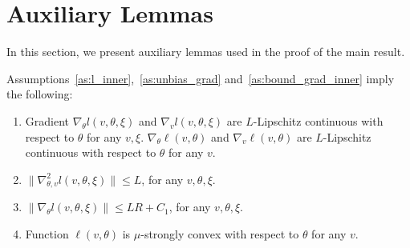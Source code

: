 \documentclass[11 pt]{article}
\begin{document}
\section{Auxiliary Lemmas}\label{app:prep}
In this section, we present auxiliary lemmas used in the proof of the main result.
\begin{lemma}\label{lemma:assumption} Assumptions~\ref{as:l_inner},~\ref{as:unbias_grad} and~\ref{as:bound_grad_inner} imply the following: 
\begin{enumerate}[label=(\arabic*)]
\item Gradient $\nabla_\theta l(v,\theta,\xi)$ and $\nabla_v l(v,\theta,\xi)$ are $L$-Lipschitz continuous with respect to $\theta$ for any $v,\xi$. $\nabla_\theta \ell(v,\theta)$ and $\nabla_v \ell(v,\theta)$ are $L$-Lipschitz continuous with respect to $\theta$ for any $v$.

\item $\| \nabla_{\theta,v}^2l(v,\theta,\xi) \| \leq L$, for any $v, \theta,\xi.$

\item $\| \nabla_\theta l(v,\theta,\xi) \| \leq LR+C_1$, for any $v, \theta,\xi.$

\item Function $\ell(v,\theta)$ is $\mu$-strongly convex with respect to $\theta$ for any $v$.
\end{enumerate}
\end{lemma}
\end{document}
